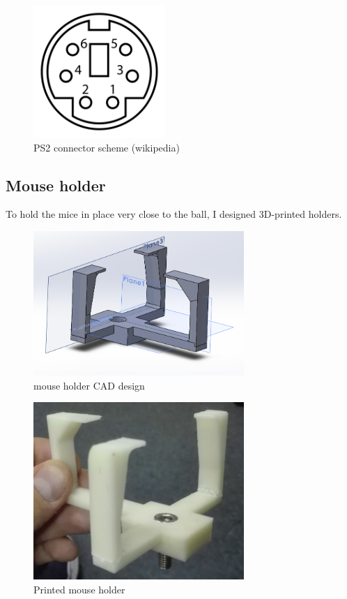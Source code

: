 \documentclass[a4paper]{article}
\begin{document}
\begin{figure}[h!]
    \centering
    \includegraphics[width = 5cm]{images/PS2.png}
    \caption{PS2 connector scheme (wikipedia)}
    \label{fig:PS2}
\end{figure}



\subsection{Mouse holder}
To hold the mice in place very close to the ball, I designed 3D-printed holders.

\begin{figure}[h!]
    \centering
    \includegraphics[width = 8cm]{images/cad1.png}
    \caption{mouse holder CAD design}
    \label{fig:cad1}
\end{figure}

\begin{figure}[h!]
    \centering
    \includegraphics[width = 8cm]{images/cad2.jpg}
    \caption{Printed mouse holder}
    \label{fig:cad2}
\end{figure}
\end{document}

